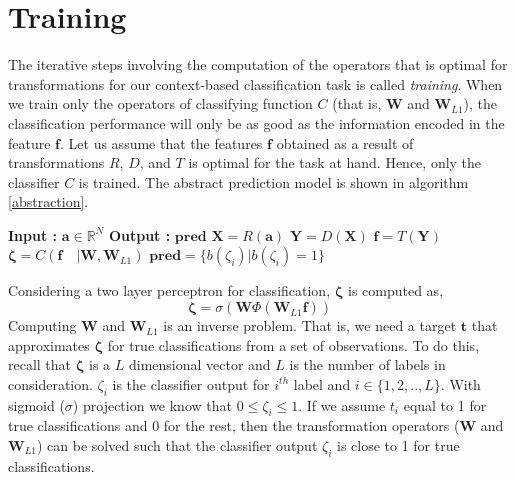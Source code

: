 \section{Training}
\label{training}
The iterative steps involving the computation of the operators that is optimal for transformations for our context-based classification task is called \textit{training}. When we train only the operators of classifying function $C$ (that is, $\textbf{W}$ and $\textbf{W}_{L1}$), the classification performance will only be as good as the information encoded in the feature $\textbf{f}$. Let us assume that the features $\textbf{f}$ obtained as a result of transformations $R$, $D$, and $T$ is optimal for the task at hand. Hence, only the classifier $C$ is trained. The abstract prediction model is shown in algorithm \ref{abstraction}.
\begin{algorithm}
  \caption{$\textbf{pred}$ = $Model$($\textbf{a}$) }\label{abstraction}
  \begin{algorithmic}[1]
    \Statex \textbf{Input :} $\textbf{a} \in \mathbb{R}^{N}$
    \Statex \textbf{Output :} $\textbf{pred}$ 
    \State $\textbf{X} = R(\textbf{a})$ 
    \State $\textbf{Y} = D(\textbf{X})$ 
    \State $\textbf{f} = T(\textbf{Y})$ 
    \State $\bm{\zeta} = C(\textbf{f} \quad |\textbf{W},\textbf{W}_{L1})$ 
    \State $\textbf{pred} = \{ b(\zeta_{i}) | b(\zeta_{i}) = 1 \}$ 
  \end{algorithmic}
\end{algorithm}
\FloatBarrier
\noindent Considering a two layer perceptron for classification, $\bm{\zeta}$ is computed as,
\[
\bm{\zeta} = \sigma ( \textbf{W} \Phi (\textbf{W}_{L1}\textbf{f})) 
\]
Computing $\textbf{W}$ and $\textbf{W}_{L1}$ is an inverse problem. That is, we need a target $\textbf{t}$ that approximates $\bm{\zeta}$ for true classifications from a set of observations. To do this, recall that $\bm{\zeta}$ is a $L$ dimensional vector and $L$ is the number of labels in consideration. $\zeta_{i}$ is the classifier output for $i^{th}$ label and $i \in \{1,2,..,L\}$. With sigmoid ($\sigma$) projection we know that $0 \leq \zeta_{i} \leq 1$. If we assume $t_{i}$ equal to 1 for true classifications and 0 for the rest, then the transformation operators ($\textbf{W}$ and $\textbf{W}_{L1}$) can be solved such that the classifier output $\zeta_{i}$ is close to 1 for true classifications.

